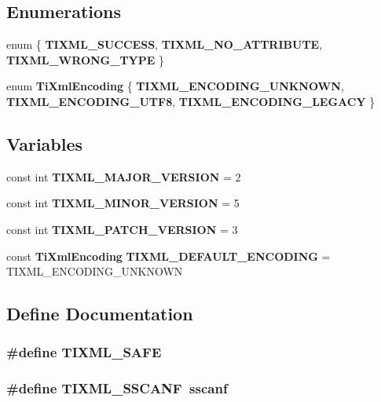 \subsection*{Enumerations}
\begin{CompactItemize}
\item 
enum \{ {\bf TIXML\_\-SUCCESS}, 
{\bf TIXML\_\-NO\_\-ATTRIBUTE}, 
{\bf TIXML\_\-WRONG\_\-TYPE}
 \}
\item 
enum {\bf TiXmlEncoding} \{ {\bf TIXML\_\-ENCODING\_\-UNKNOWN}, 
{\bf TIXML\_\-ENCODING\_\-UTF8}, 
{\bf TIXML\_\-ENCODING\_\-LEGACY}
 \}
\end{CompactItemize}
\subsection*{Variables}
\begin{CompactItemize}
\item 
const int {\bf TIXML\_\-MAJOR\_\-VERSION} = 2
\item 
const int {\bf TIXML\_\-MINOR\_\-VERSION} = 5
\item 
const int {\bf TIXML\_\-PATCH\_\-VERSION} = 3
\item 
const {\bf TiXmlEncoding} {\bf TIXML\_\-DEFAULT\_\-ENCODING} = TIXML\_\-ENCODING\_\-UNKNOWN
\end{CompactItemize}


\subsection{Define Documentation}
\subsubsection{\setlength{\rightskip}{0pt plus 5cm}\#define TIXML\_\-SAFE}\label{tinyxml_8h_5cdc3f402b6b8788f13a408d2be12e8d}


\subsubsection{\setlength{\rightskip}{0pt plus 5cm}\#define TIXML\_\-SSCANF~sscanf}\label{tinyxml_8h_96f54d7c855ad92e705510904a040393}


